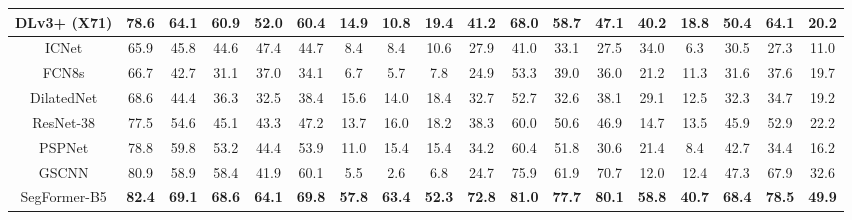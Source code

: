 \begin{savenotes}
\begin{minipage}{1.0\textwidth}
{\begin{tabular}{c|c|cccc|cccc|cccc|cccc}
\multicolumn{1}{c|}{DLv3+ (X71)} & \multicolumn{1}{c|}{78.6} & 64.1 & 60.9 & 52.0 & \multicolumn{1}{c|}{60.4} & 14.9 & 10.8 & 19.4 & \multicolumn{1}{c|}{41.2} & 68.0 & 58.7 & 47.1 & \multicolumn{1}{c|}{40.2} & 18.8 & 50.4 & 64.1 & 20.2 \\
\midrule
\multicolumn{1}{c|}{ICNet} & \multicolumn{1}{c|}{65.9} & 45.8 & 44.6 & 47.4 & \multicolumn{1}{c|}{44.7} & 8.4 & 8.4 & 10.6 & \multicolumn{1}{c|}{27.9} & 41.0 & 33.1 & 27.5 & \multicolumn{1}{c|}{34.0} & 6.3 & 30.5 & 27.3 & 11.0 \\
\multicolumn{1}{c|}{FCN8s} & \multicolumn{1}{c|}{66.7} & 42.7 & 31.1 & 37.0 & \multicolumn{1}{c|}{34.1} & 6.7 & 5.7 & 7.8 & \multicolumn{1}{c|}{24.9} & 53.3 & 39.0 & 36.0 & \multicolumn{1}{c|}{21.2} & 11.3 & 31.6 & 37.6 & 19.7 \\
\multicolumn{1}{c|}{DilatedNet} & \multicolumn{1}{c|}{68.6} & 44.4 & 36.3 & 32.5 & \multicolumn{1}{c|}{38.4} & 15.6 & 14.0 & 18.4 & \multicolumn{1}{c|}{32.7} & 52.7 & 32.6 & 38.1 & \multicolumn{1}{c|}{29.1} & 12.5 & 32.3 & 34.7 & 19.2 \\
\multicolumn{1}{c|}{ResNet-38} & \multicolumn{1}{c|}{77.5} & 54.6 & 45.1 & 43.3 & \multicolumn{1}{c|}{47.2} & 13.7 & 16.0 & 18.2 & \multicolumn{1}{c|}{38.3} & 60.0 & 50.6 & 46.9 & \multicolumn{1}{c|}{14.7} & 13.5 & 45.9 & 52.9 & 22.2 \\
\multicolumn{1}{c|}{PSPNet} & \multicolumn{1}{c|}{78.8} & 59.8 & 53.2 & 44.4 & \multicolumn{1}{c|}{53.9} & 11.0 & 15.4 & 15.4 & \multicolumn{1}{c|}{34.2} & 60.4 & 51.8 & 30.6 & \multicolumn{1}{c|}{21.4} & 8.4 & 42.7 & 34.4 & 16.2 \\
\multicolumn{1}{c|}{GSCNN} & \multicolumn{1}{c|}{80.9} & 58.9 & 58.4 & 41.9 & \multicolumn{1}{c|}{60.1} & 5.5 & 2.6 & 6.8 & \multicolumn{1}{c|}{24.7} & 75.9 & 61.9 & 70.7 & \multicolumn{1}{c|}{12.0} & 12.4 & 47.3 & 67.9 & 32.6 \\
\midrule
\multicolumn{1}{c|}{SegFormer-B5}& \multicolumn{1}{c|}{\textbf{82.4}} & \textbf{69.1}  & \textbf{68.6}  & \textbf{64.1}  & \multicolumn{1}{c|}{\textbf{69.8}} & \textbf{57.8}  & \textbf{63.4}  & \textbf{52.3}  & \multicolumn{1}{c|}{\textbf{72.8}} & \textbf{81.0}  & \textbf{77.7}  & \textbf{80.1}  & \multicolumn{1}{c|}{\textbf{58.8}} & \textbf{40.7}  & \textbf{68.4}  & \textbf{78.5}  & \textbf{49.9}  \\
\bottomrule
\end{tabular}
}
\end{minipage}
\end{savenotes}


